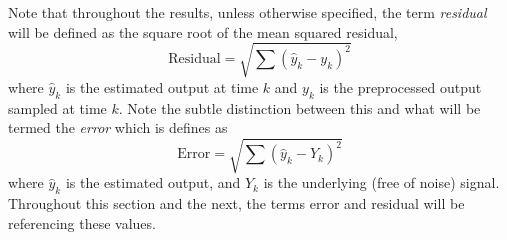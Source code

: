 Note that throughout the results, unless otherwise specified,
the term \emph{residual} will be defined as the square root of the mean squared residual, 
\begin{equation}
\text{Residual} = \sqrt{\sum (\hat{y}_k - y_k)^2}
\end{equation}
where $\hat{y}_k$ is the estimated output at time $k$ and $y_k$ is the preprocessed output
sampled at time $k$. Note the subtle distinction between this and what will be 
termed the \emph{error} which is defines as 
\begin{equation}
\text{Error} = \sqrt{\sum (\hat{y}_k - Y_k)^2}
\end{equation}
where $\hat{y}_k$ is the estimated output, and $Y_k$ is the underlying (free of noise)
signal. Throughout this section and the next, the terms error and residual
will be referencing these values.


